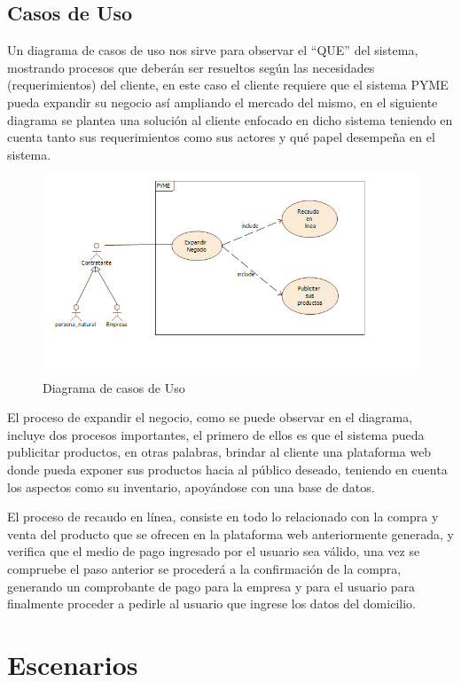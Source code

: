\subsection{Casos de Uso}

Un diagrama de casos de uso nos sirve para observar el “QUE” del sistema, mostrando procesos que deberán ser resueltos según las necesidades (requerimientos) del cliente, en este caso el cliente requiere que el sistema PYME pueda expandir su negocio así ampliando el mercado del mismo, en el siguiente diagrama se plantea una solución al cliente enfocado en dicho sistema teniendo en cuenta tanto sus requerimientos como sus actores y qué papel desempeña en el sistema.


\begin{figure}[th!]
	\centering
	\includegraphics[width=0.7\linewidth]{arquitectura/imagenes/casosDeUso}
	\caption{Diagrama de  casos de Uso}
\end{figure}

El proceso de expandir el negocio, como  se puede observar en el diagrama, incluye dos procesos importantes, el primero de ellos es que el sistema pueda publicitar productos, en otras palabras,  brindar al cliente una plataforma web donde pueda exponer sus productos hacia al público deseado, teniendo en cuenta los aspectos como su inventario, apoyándose con una base de datos.

El proceso de recaudo en línea, consiste en todo lo relacionado con la compra y venta del producto que se ofrecen en la plataforma web anteriormente generada, y verifica que el medio de pago ingresado por el usuario sea válido, una vez se compruebe el paso anterior se procederá a la confirmación de la compra, generando un comprobante de pago para la empresa y para el usuario para finalmente  proceder a pedirle al usuario que ingrese los datos del domicilio.


\newpage


\section{Escenarios}

